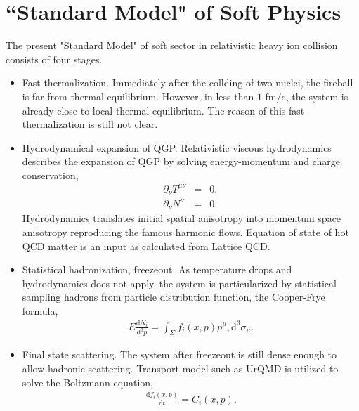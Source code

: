 \documentclass[aps,prl,twocolumn,groupedaddress]{revtex4-1}
\begin{document}
\section{``Standard Model" of Soft Physics}
	The present "Standard Model" of soft sector in relativistic heavy ion collision consists of four stages.
	\begin{itemize}
		\item Fast thermalization. 
		Immediately after the collding of two nuclei, the fireball is far from thermal equilibrium. However, in less than $1 \textrm{ fm/c}$, the system is already close to local thermal equilibrium. 
		The reason of this fast thermalization is still not clear.
		\item Hydrodynamical expansion of QGP. 
		Relativistic viscous hydrodynamics describes the expansion of QGP by solving energy-momentum and charge conservation,
		\begin{eqnarray}
			\partial_\nu T^{\mu\nu} &=& 0, \\
			\partial_\nu N^{\nu} &=& 0. 
		\end{eqnarray}
		Hydrodynamics translates initial spatial anisotropy into momentum space anisotropy reproducing the famous harmonic flows. 
		Equation of state of hot QCD matter is an input as calculated from Lattice QCD.

		\item Statistical hadronization, freezeout. 
		As temperature drops and hydrodynamics does not apply, the system is particularized by statistical sampling hadrons from particle distribution function, the Cooper-Frye formula,
		\begin{eqnarray}
			E\frac{\mathrm{d}N_i}{\mathrm{d}^3p} = \int_\Sigma f_i(x, p)p^\mu,\mathrm{d}^3\sigma_\mu.
		\end{eqnarray}
		\item Final state scattering. 
		The system after freezeout is still dense enough to allow hadronic scattering. 
		Transport model such as UrQMD is utilized to solve the Boltzmann equation,
		\begin{eqnarray}
			\frac{\mathrm{d}f_i(x, p)}{\mathrm{d}t} = C_i(x, p).
		\end{eqnarray}
	\end{itemize}
\end{document}
